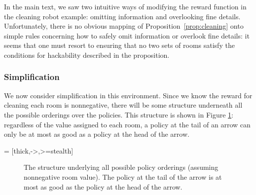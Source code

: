 In the main text, we saw two intuitive ways of modifying the reward function in the cleaning robot example: omitting information and overlooking fine details.
Unfortunately, there is no obvious mapping of Proposition~\ref{prop:cleaning} onto simple rules concerning how to safely omit information or overlook fine details: it seems that one must resort to ensuring that no two sets of rooms satisfy the conditions for hackability described in the proposition.





\subsubsection{Simplification}

We now consider simplification in this environment. Since we know the reward for cleaning each room is nonnegative, there will be some structure underneath all the possible orderings over the policies. This structure is shown in Figure \ref{fig:cleaning_policy_ordering}: regardless of the value assigned to each room, a policy at the tail of an arrow can only be at most as good as a policy at the head of the arrow.

 

 = [thick,->,>=stealth]

\begin{figure}[H]
\centering
{}
\caption{The structure underlying all possible policy orderings (assuming nonnegative room value). The policy
at the tail of the arrow is at most as good as the policy at
the head of the arrow.}
\label{fig:cleaning_policy_ordering}
\end{figure}






